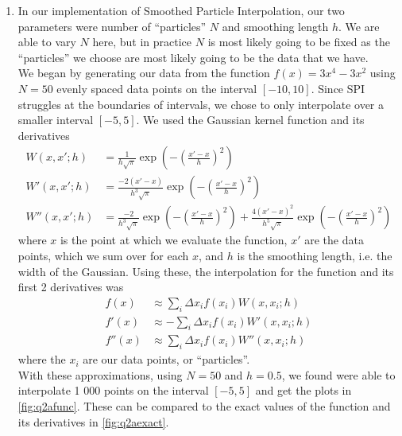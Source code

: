 \documentclass[11pt]{article}
\begin{document}
\begin{enumerate}
    \item In our implementation of Smoothed Particle Interpolation, our two parameters were number of ``particles'' $N$ and smoothing length $h$. We are able to vary $N$ here, but in practice $N$ is most likely going to be fixed as the ``particles'' we choose are most likely going to be the data that we have. \\
    We began by generating our data from the function $f(x)=3x^4-3x^2$ using $N=50$ evenly spaced data points on the interval $[-10,10]$. Since SPI struggles at the boundaries of intervals, we chose to only interpolate over a smaller interval $[-5,5]$. We used the Gaussian kernel function and its derivatives
    \begin{align}
        W(x,x';h) &= \frac{1}{h\sqrt{\pi}}\exp\left(-\left(\frac{x'-x}{h}\right)^2\right) \label{eqn:GaussianKernel}\\
        W'(x,x';h) &= \frac{-2(x'-x)}{h^3\sqrt{\pi}}\exp\left(-\left(\frac{x'-x}{h}\right)^2\right) \label{eqn:GaussianKernelPrime}\\
        W''(x,x';h) &= \frac{-2}{h^3\sqrt{\pi}}\exp\left(-\left(\frac{x'-x}{h}\right)^2\right) + \frac{4(x'-x)^2}{h^5\sqrt{\pi}}\exp\left(-\left(\frac{x'-x}{h}\right)^2\right) \label{eqn:GaussianKernelPrimePrime}
    \end{align}
    where $x$ is the point at which we evaluate the function, $x'$ are the data points, which we sum over for each $x$, and $h$ is the smoothing length, i.e. the width of the Gaussian. Using these, the interpolation for the function and its first 2 derivatives was 
    \begin{align}
        f(x)&\approx \sum_i \Delta x_i f(x_i) W(x,x_i;h) \label{eqn:SPI}\\
        f'(x)&\approx -\sum_i \Delta x_i f(x_i) W'(x,x_i;h) \label{eqn:SPIPrime}\\
        f''(x)&\approx \sum_i \Delta x_i f(x_i) W''(x,x_i;h) \label{eqn:SPIPrimePrime}
    \end{align}
    where the $x_i$ are our data points, or ``particles''.\\
    With these approximations, using $N=50$ and $h=0.5$, we found were able to interpolate 1 000 points on the interval $[-5,5]$ and get the plots in \cref{fig:q2afunc}. These can be compared to the exact values of the function and its derivatives in \cref{fig:q2aexact}.


\end{enumerate}
\end{document}
